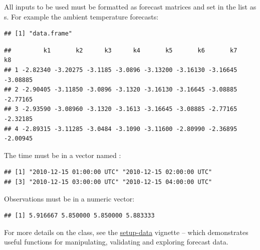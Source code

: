 All inputs to be used must be formatted as forecast matrices and set in the list
as s. For example the ambient temperature forecasts:
\begin{knitrout}
\color{fgcolor}\begin{kframe}
\begin{alltt}
\hlopt{\$}
\end{alltt}
\begin{verbatim}
## [1] "data.frame"
\end{verbatim}
\begin{alltt}
\hlopt{\$}\hlstd{Ta[ ,}\hlopt{:}\hlstd{],} \hlstd{)}
\end{alltt}
\begin{verbatim}
##         k1       k2      k3      k4       k5       k6       k7       k8
## 1 -2.82340 -3.20275 -3.1185 -3.0896 -3.13200 -3.16130 -3.16645 -3.08885
## 2 -2.90405 -3.11850 -3.0896 -3.1320 -3.16130 -3.16645 -3.08885 -2.77165
## 3 -2.93590 -3.08960 -3.1320 -3.1613 -3.16645 -3.08885 -2.77165 -2.32185
## 4 -2.89315 -3.11285 -3.0484 -3.1090 -3.11600 -2.80990 -2.36895 -2.00945
\end{verbatim}
\end{kframe}
\end{knitrout}
\noindent The time must be in a  vector named :
\begin{knitrout}
\color{fgcolor}\begin{kframe}
\begin{alltt}
\hlopt{\$}\hlstd{t[}\hlopt{:}\hlstd{]}
\end{alltt}
\begin{verbatim}
## [1] "2010-12-15 01:00:00 UTC" "2010-12-15 02:00:00 UTC"
## [3] "2010-12-15 03:00:00 UTC" "2010-12-15 04:00:00 UTC"
\end{verbatim}
\end{kframe}
\end{knitrout}
\noindent Observations must be in a numeric vector:
\begin{knitrout}
\color{fgcolor}\begin{kframe}
\begin{alltt}
\hlopt{\$}\hlstd{heatload[}\hlopt{:}\hlstd{]}
\end{alltt}
\begin{verbatim}
## [1] 5.916667 5.850000 5.850000 5.883333
\end{verbatim}
\end{kframe}
\end{knitrout}
\noindent For more details on the  class, see the
\href{https://onlineforecasting.org/vignettes/setup-data.html}{setup-data}
vignette -- which demonstrates useful
functions for manipulating, validating and exploring forecast data.


